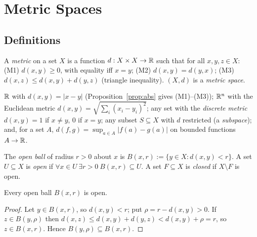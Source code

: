 \chapter{Metric Spaces}\label{ch:metric}

\section{Definitions}

\begin{definition}[Metric]
	A \emph{metric} on a set $X$ is a function $d:X\times X\to\mathbb{R}$ such that for all $x,y,z\in X$: (M1) $d(x,y)\ge0$, with equality iff $x=y$; (M2) $d(x,y)=d(y,x)$; (M3) $d(x,z)\le d(x,y)+d(y,z)$ (triangle inequality). $(X,d)$ is a \emph{metric space}.
\end{definition}

\begin{example}
	$\mathbb{R}$ with $d(x,y)=|x-y|$ (Proposition~\ref{prop:abs} gives (M1)--(M3)); $\mathbb{R}^n$ with the Euclidean metric $d(x,y)=\sqrt{\sum_i(x_i-y_i)^2}$; any set with the \emph{discrete metric} $d(x,y)=1$ if $x\ne y$, $0$ if $x=y$; any subset $S\subseteq X$ with $d$ restricted (a \emph{subspace}); and, for a set $A$, $d(f,g)=\sup_{a\in A}|f(a)-g(a)|$ on bounded functions $A\to\mathbb{R}$.
\end{example}

\begin{definition}
	The \emph{open ball} of radius $r>0$ about $x$ is $B(x,r):=\{y\in X:d(x,y)<r\}$. A set $U\subseteq X$ is \emph{open} if $\forall x\in U\ \exists r>0\ B(x,r)\subseteq U$. A set $F\subseteq X$ is \emph{closed} if $X\setminus F$ is open.
\end{definition}

\begin{proposition}\label{prop:ballopen}
	Every open ball $B(x,r)$ is open.
\end{proposition}
\begin{proof}
	Let $y\in B(x,r)$, so $d(x,y)<r$; put $\rho=r-d(x,y)>0$. If $z\in B(y,\rho)$ then $d(x,z)\le d(x,y)+d(y,z)<d(x,y)+\rho=r$, so $z\in B(x,r)$. Hence $B(y,\rho)\subseteq B(x,r)$.
\end{proof}

